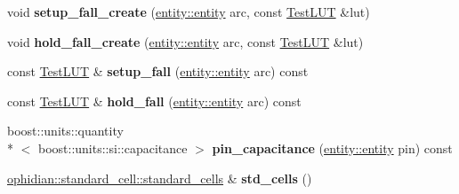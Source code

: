 \begin{DoxyCompactItemize}
\item 
\hypertarget{classophidian_1_1timing_1_1library_a2f1566a609778f58ac45a2d2ad6d8715}{void {\bfseries setup\-\_\-fall\-\_\-create} (\hyperlink{classophidian_1_1entity_1_1entity}{entity\-::entity} arc, const \hyperlink{classophidian_1_1timing_1_1lookup__table}{Test\-L\-U\-T} \&lut)}\label{classophidian_1_1timing_1_1library_a2f1566a609778f58ac45a2d2ad6d8715}

\item 
\hypertarget{classophidian_1_1timing_1_1library_a1dcdd86bf4493227660694c93b625437}{void {\bfseries hold\-\_\-fall\-\_\-create} (\hyperlink{classophidian_1_1entity_1_1entity}{entity\-::entity} arc, const \hyperlink{classophidian_1_1timing_1_1lookup__table}{Test\-L\-U\-T} \&lut)}\label{classophidian_1_1timing_1_1library_a1dcdd86bf4493227660694c93b625437}

\item 
\hypertarget{classophidian_1_1timing_1_1library_a310b30a45dbbc4df6c2add6096fd1864}{const \hyperlink{classophidian_1_1timing_1_1lookup__table}{Test\-L\-U\-T} \& {\bfseries setup\-\_\-fall} (\hyperlink{classophidian_1_1entity_1_1entity}{entity\-::entity} arc) const }\label{classophidian_1_1timing_1_1library_a310b30a45dbbc4df6c2add6096fd1864}

\item 
\hypertarget{classophidian_1_1timing_1_1library_adacc6ed2658a61e6ddea0bfd5bfdc388}{const \hyperlink{classophidian_1_1timing_1_1lookup__table}{Test\-L\-U\-T} \& {\bfseries hold\-\_\-fall} (\hyperlink{classophidian_1_1entity_1_1entity}{entity\-::entity} arc) const }\label{classophidian_1_1timing_1_1library_adacc6ed2658a61e6ddea0bfd5bfdc388}

\item 
\hypertarget{classophidian_1_1timing_1_1library_a646949c4832f6468123351064b255bbd}{boost\-::units\-::quantity\\*
$<$ boost\-::units\-::si\-::capacitance $>$ {\bfseries pin\-\_\-capacitance} (\hyperlink{classophidian_1_1entity_1_1entity}{entity\-::entity} pin) const }\label{classophidian_1_1timing_1_1library_a646949c4832f6468123351064b255bbd}

\item 
\hypertarget{classophidian_1_1timing_1_1library_ad7f737ee38aaf8310ea436c167d52ca9}{\hyperlink{classophidian_1_1standard__cell_1_1standard__cells}{ophidian\-::standard\-\_\-cell\-::standard\-\_\-cells} \& {\bfseries std\-\_\-cells} ()}\label{classophidian_1_1timing_1_1library_ad7f737ee38aaf8310ea436c167d52ca9}


\end{DoxyCompactItemize}

